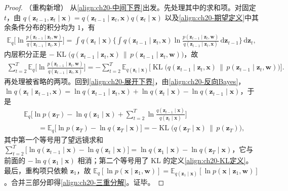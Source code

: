 \documentclass[../../main.tex]{subfiles}
\begin{document}
\begin{proof}（重构新增）
从\eqref{align:ch20-中间下界}出发。先处理其中的求和项。对固定 $t$，由 $q(\bm{z}_{t-1},\bm{z}_t\mid\bm{x})=q(\bm{z}_{t-1}\mid\bm{z}_t,\bm{x})q(\bm{z}_t\mid\bm{x})$ 以及\eqref{align:ch20-期望定义}中其余条件分布的积分均为 $1$，有
\begin{align*}
\mathbb{E}_{q}\Big[\ln\frac{p(\bm{z}_{t-1}\mid\bm{z}_t,\bm{w})}{q(\bm{z}_{t-1}\mid\bm{z}_t,\bm{x})}\Big]=\int q(\bm{z}_t\mid\bm{x})\Big\{\int q(\bm{z}_{t-1}\mid\bm{z}_t,\bm{x})\ln\frac{p(\bm{z}_{t-1}\mid\bm{z}_t,\bm{w})}{q(\bm{z}_{t-1}\mid\bm{z}_t,\bm{x})}\,\mathrm{d}\bm{z}_{t-1}\Big\}\,\mathrm{d}\bm{z}_t,
\end{align*}
内层积分正是 $-\operatorname{KL}\big(q(\bm{z}_{t-1}\mid\bm{z}_t,\bm{x})\,\|\,p(\bm{z}_{t-1}\mid\bm{z}_t,\bm{w})\big)$，故
\begin{align*}
\sum_{t=2}^{T}\mathbb{E}_{q}\Big[\ln\frac{p(\bm{z}_{t-1}\mid\bm{z}_t,\bm{w})}{q(\bm{z}_{t-1}\mid\bm{z}_t,\bm{x})}\Big]=-\sum_{t=2}^{T}\mathbb{E}_{q(\bm{z}_t\mid\bm{x})}\Big[\operatorname{KL}\big(q(\bm{z}_{t-1}\mid\bm{z}_t,\bm{x})\,\|\,p(\bm{z}_{t-1}\mid\bm{z}_t,\bm{w})\big)\Big].
\end{align*}
再处理被省略的两项。回到\eqref{align:ch20-展开下界}，由\eqref{align:ch20-反向Bayes}，$\ln q(\bm{z}_t\mid\bm{z}_{t-1},\bm{x})=\ln q(\bm{z}_{t-1}\mid\bm{z}_t,\bm{x})+\ln q(\bm{z}_t\mid\bm{x})-\ln q(\bm{z}_{t-1}\mid\bm{x})$，于是
\begin{align*}
&\mathbb{E}_{q}\Big[\ln p(\bm{z}_T)-\ln q(\bm{z}_1\mid\bm{x})+\sum_{t=2}^{T}\ln\frac{q(\bm{z}_{t-1}\mid\bm{x})}{q(\bm{z}_t\mid\bm{x})}\Big]\\
&\qquad=\mathbb{E}_{q}\big[\ln p(\bm{z}_T)-\ln q(\bm{z}_T\mid\bm{x})\big]=-\operatorname{KL}\big(q(\bm{z}_T\mid\bm{x})\,\|\,p(\bm{z}_T)\big),
\end{align*}
其中第一个等号用了望远镜求和 $\sum_{t=2}^{T}\big[\ln q(\bm{z}_{t-1}\mid\bm{x})-\ln q(\bm{z}_t\mid\bm{x})\big]=\ln q(\bm{z}_1\mid\bm{x})-\ln q(\bm{z}_T\mid\bm{x})$，它与前面的 $-\ln q(\bm{z}_1\mid\bm{x})$ 相消；第二个等号用了 KL 的定义\eqref{align:ch20-KL定义}。最后，重构项只依赖 $\bm{z}_1$，故 $\mathbb{E}_q[\ln p(\bm{x}\mid\bm{z}_1,\bm{w})]=\mathbb{E}_{q(\bm{z}_1\mid\bm{x})}[\ln p(\bm{x}\mid\bm{z}_1,\bm{w})]$。合并三部分即得\eqref{align:ch20-三重分解}。证毕。
\end{proof}
\end{document}
